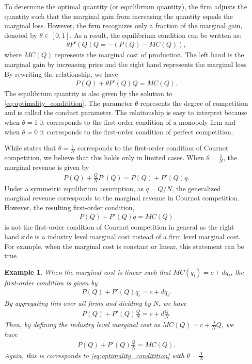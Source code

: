 \documentclass[11pt, a4paper]{article}
\newtheorem{example}{Example}
\theoremstyle{remark}
\begin{document}
To determine the optimal quantity (or equilibrium quantity), the firm adjusts the quantity such that the marginal gain from increasing the quantity equals the marginal loss. 
However, the firm recognizes only a fraction of the marginal gain, denoted by $\theta \in [0,1]$. 
As a result, the equilibrium condition can be written as:
\begin{align}
    \theta P'(Q)Q = - (P(Q) - MC(Q)),
\end{align}
where $MC(Q)$ represents the marginal cost of production.
The left hand is the marginal gain by increasing price and the right hand represents the marginal loss.
By rewriting the relationship, we have
\begin{align}
    P(Q)+ \theta P'(Q)Q = MC(Q). \label{eq:optimality_conditition}
\end{align}
The equilibrium quantity is also given by the solution to \eqref{eq:optimality_conditition}.
The parameter $\theta$ represents the degree of competition and is called the conduct parameter.
The relationship is easy to interpret because when $\theta = 1$ it corresponds to the first-order condition of a monopoly firm and when $\theta = 0$ it corresponds to the first-order condition of perfect competition.

While \citet{bresnahan1982oligopoly} states that $\theta = \frac{1}{N}$ corresponds to the first-order condition of Cournot competition, we believe that this holds only in limited cases.
When $\theta = \frac{1}{N}$, the marginal revenue is given by
\begin{align}
    P(Q) + \frac{Q}{N}P'(Q) = P(Q) + P'(Q)q.
\end{align}
Under a symmetric equilibrium assumption, as $q = Q/N$, the generalized marginal revenue corresponds to the marginal revenue in Cournot competition.
However, the resulting first-order condition,
\begin{align}
    P(Q) + P'(Q)q = MC(Q)
\end{align}
is not the first-order condition of Cournot competition in general as the right hand side is a industry level marginal cost instead of a firm level marginal cost.
For example, when the marginal cost is constant or linear, this statement can be true.


\begin{example}
When the marginal cost is linear such that $MC(q_i) = c + dq_i$, the first-order condition is given by
\begin{align}
    P(Q) + P'(Q)q_i = c + dq_i.
\end{align}
By aggregating this over all firms and dividing by $N$, we have
\begin{align}
    P(Q) + P'(Q)\frac{Q}{N} = c + d\frac{Q}{N}.
\end{align}
Then, by defining the industry level marginal cost as $MC(Q) = c + \frac{d}{N}Q$, we have
\begin{align}
    P(Q) + P'(Q)\frac{Q}{N} = MC(Q).
\end{align}
Again, this is corresponds to \eqref{eq:optimality_conditition} with $\theta = \frac{1}{N}$.
\end{example}
\end{document}
